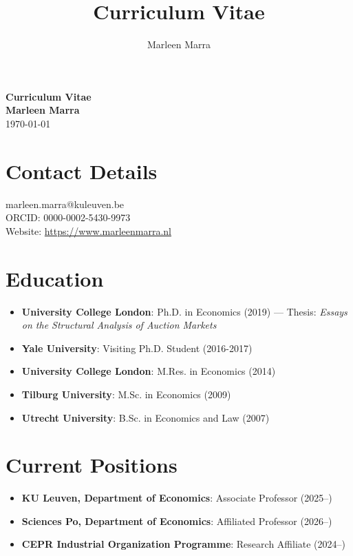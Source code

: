 \documentclass[11pt,a4paper]{article}
\title{Curriculum Vitae}
\author{Marleen Marra}
\date{}
\begin{document}
\begin{center}
{\Large \textbf{Curriculum Vitae}}\\[0.2cm]
{\large \textbf{Marleen Marra}}\\[0.1cm]
{\small \today}
\end{center}

\vspace{0.3cm}

\section*{Contact Details}
\noindent
marleen.marra@kuleuven.be \\
ORCID: 0000-0002-5430-9973 \\
Website: \url{https://www.marleenmarra.nl}

\section*{Education}
\begin{itemize}
\renewcommand{\labelitemi}{\fontsize{4}{4}\selectfont$\blacksquare$}
\item \textbf{University College London}: Ph.D. in Economics (2019) --- Thesis: \emph{Essays on the Structural Analysis of Auction Markets} \vspace{0.1cm}
\item \textbf{Yale University}: Visiting Ph.D. Student (2016-2017) \vspace{0.1cm}
\item \textbf{University College London}: M.Res. in Economics (2014) \vspace{0.1cm}
\item \textbf{Tilburg University}: M.Sc. in Economics (2009) \vspace{0.1cm}
\item \textbf{Utrecht University}: B.Sc. in Economics and Law (2007) \vspace{0.1cm}
\end{itemize}


\section*{Current Positions}
\begin{itemize}
\renewcommand{\labelitemi}{\fontsize{4}{4}\selectfont$\blacksquare$}
\item \textbf{KU Leuven, Department of Economics}: Associate Professor (2025--) \vspace{0.1cm}
\item \textbf{Sciences Po, Department of Economics}: Affiliated Professor (2026--) \vspace{0.1cm}
\item \textbf{CEPR Industrial Organization Programme}: Research Affiliate (2024--) \vspace{0.1cm}
\end{itemize}
\end{document}
